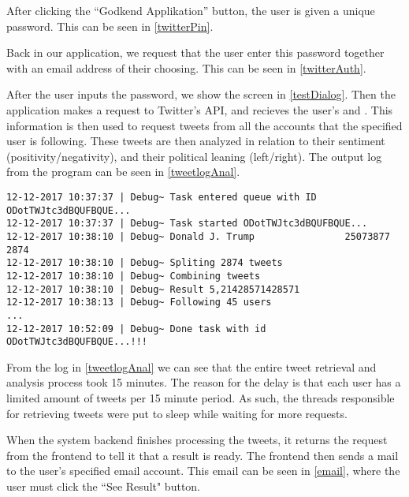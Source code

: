 After clicking the ``Godkend Applikation'' button, the user is given a unique
password. This can be seen in \autoref{twitterPin}.\nl


Back in our application, we request that the user enter this password
together with an email address of their choosing. This can be seen in
\autoref{twitterAuth}.\nl


After the user inputs the password, we show the screen in \autoref{testDialog}.
Then the application makes a request to Twitter's API, and recieves the user's
 and . This information is
then used to request tweets from all the accounts that the specified user is
following. These tweets are then analyzed in relation to their sentiment
(positivity/negativity), and their political leaning (left/right). The output
log from the program can be seen in \autoref{tweetlogAnal}. \nl


\begin{minipage}[H]{\linewidth}
\begin{lstlisting}[caption = Log from tweet retrieval and analysis, label = tweetlogAnal] 
12-12-2017 10:37:37 | Debug~ Task entered queue with ID ODotTWJtc3dBQUFBQUE...
12-12-2017 10:37:37 | Debug~ Task started ODotTWJtc3dBQUFBQUE...
12-12-2017 10:38:10 | Debug~ Donald J. Trump                25073877             2874       
12-12-2017 10:38:10 | Debug~ Spliting 2874 tweets
12-12-2017 10:38:10 | Debug~ Combining tweets
12-12-2017 10:38:10 | Debug~ Result 5,21428571428571
12-12-2017 10:38:13 | Debug~ Following 45 users
...
12-12-2017 10:52:09 | Debug~ Done task with id ODotTWJtc3dBQUFBQUE...!!!
\end{lstlisting}
\end{minipage}

From the log in \autoref{tweetlogAnal} we can see that the entire tweet
retrieval and analysis process took 15 minutes. The reason for the delay is that
each user has a limited amount of tweets per 15 minute period. As such, the
threads responsible for retrieving tweets were put to sleep while waiting for
more requests.\nl

When the system backend finishes processing the tweets, it returns the request
from the frontend to tell it that a result is ready. The frontend then sends a
mail to the user's specified email account. This email can be seen in
\autoref{email}, where the user must click the ``See Result" button.\nl

